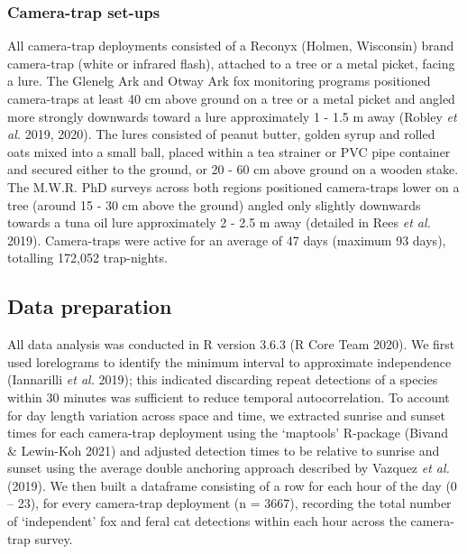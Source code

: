 \documentclass[11pt,a4paper,titlepage,twoside,openright]{style/unimelbthesis}
\begin{document}
\begin{mainmatter}
\hypertarget{camera-trap-set-ups-1}{%
\subsubsection{Camera-trap set-ups}\label{camera-trap-set-ups-1}}

All camera-trap deployments consisted of a Reconyx (Holmen, Wisconsin) brand camera-trap (white or infrared flash), attached to a tree or a metal picket, facing a lure. The Glenelg Ark and Otway Ark fox monitoring programs positioned camera-traps at least 40 cm above ground on a tree or a metal picket and angled more strongly downwards toward a lure approximately 1 - 1.5 m away (Robley \emph{et al.} 2019, 2020). The lures consisted of peanut butter, golden syrup and rolled oats mixed into a small ball, placed within a tea strainer or PVC pipe container and secured either to the ground, or 20 - 60 cm above ground on a wooden stake. The M.W.R. PhD surveys across both regions positioned camera-traps lower on a tree (around 15 - 30 cm above the ground) angled only slightly downwards towards a tuna oil lure approximately 2 - 2.5 m away (detailed in Rees \emph{et al.} 2019). Camera-traps were active for an average of 47 days (maximum 93 days), totalling 172,052 trap-nights.

\hypertarget{data-preparation}{%
\subsection{Data preparation}\label{data-preparation}}

All data analysis was conducted in R version 3.6.3 (R Core Team 2020). We first used lorelograms to identify the minimum interval to approximate independence (Iannarilli \emph{et al.} 2019); this indicated discarding repeat detections of a species within 30 minutes was sufficient to reduce temporal autocorrelation. To account for day length variation across space and time, we extracted sunrise and sunset times for each camera-trap deployment using the `maptools' R-package (Bivand \& Lewin-Koh 2021) and adjusted detection times to be relative to sunrise and sunset using the average double anchoring approach described by Vazquez \emph{et al.} (2019). We then built a dataframe consisting of a row for each hour of the day (0 -- 23), for every camera-trap deployment (n = 3667), recording the total number of `independent' fox and feral cat detections within each hour across the camera-trap survey.

\hypertarget{generalised-additive-models-5}{%
}
\end{mainmatter}
\end{document}
